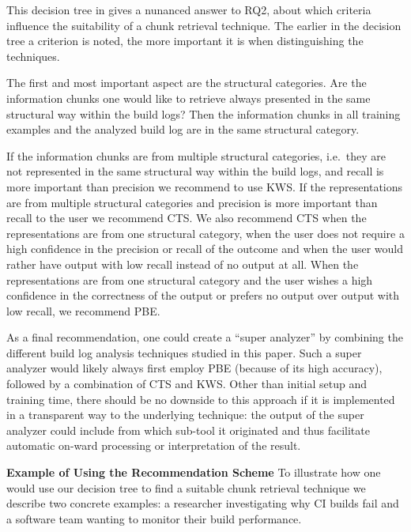 This decision tree in  gives a nunanced
answer to RQ2, about which criteria influence the suitability of a
chunk retrieval technique.
The earlier in the decision tree a
criterion is noted, the more important it is when distinguishing the
techniques.

The first and most important aspect are the structural categories.
Are
the information chunks one would like to retrieve always presented in
the same structural way within the build logs? Then the information
chunks in all training examples and the analyzed build log are in the
same structural category.

If the information chunks are from multiple structural categories,
i.e.\ they are not represented in the same structural way within the
build logs, and recall is more important than precision we recommend
to use KWS\@.
If the representations are from multiple structural
categories and precision is more important than recall to the user we
recommend CTS\@.
We also recommend CTS when the representations are
from one structural category, when the user does not require a high
confidence in the precision or recall of the outcome and when the user
would rather have output with low recall instead of no output at all.
When the representations are from one structural category and the user
wishes a high confidence in the correctness of the output or prefers
no output over output with low recall, we recommend PBE\@.

As a final recommendation, one could create a ``super analyzer'' by
combining the different build log analysis techniques studied in this
paper.
Such a super analyzer would likely always first employ PBE
(because of its high accuracy), followed by a combination of CTS and
KWS\@.
Other than initial setup and training time, there should be no
downside to this approach if it is implemented in a transparent way to
the underlying technique: the output of the super analyzer could
include from which sub-tool it originated and thus facilitate
automatic on-ward processing or interpretation of the result.


\noindent
\textbf{Example of Using the Recommendation Scheme}
To illustrate how one would use our decision tree to find a suitable
chunk retrieval technique we describe two concrete examples: a
researcher investigating why CI builds fail and a software team
wanting to monitor their build performance.

